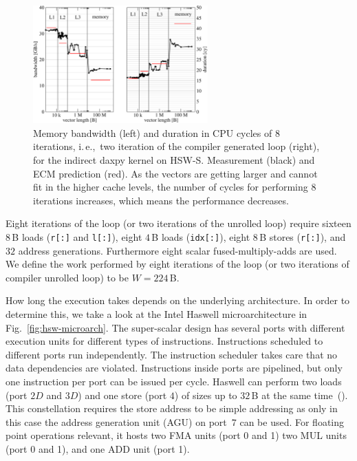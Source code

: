 \begin{figure}[t]
  \centering
  \includegraphics[width=0.60\textwidth,clip=true]{images/daxpy-indirect-bw-hasep1-f-2_3-w-cy}
   \caption{Memory bandwidth (left) and duration in CPU cycles of 8 iterations, i.\,e.,\ two iteration of the
compiler generated loop (right), for the indirect daxpy kernel on HSW-S.
   Measurement (black) and ECM prediction (red).
   As the vectors are getting larger and cannot fit in the higher cache levels, the number of cycles for performing 8 iterations increases, which means the performance decreases.}
  \label{fig:daxpy-indirect:perf}
\end{figure}

Eight iterations of the loop (or two iterations of the unrolled loop) require
sixteen $8$\,B loads (\verb|r[:]| and
\verb|l[:]|), eight $4$\,B loads (\verb'idx[:]'), eight
$8$\,B stores (\verb'r[:]'), and $32$ address generations.
Furthermore eight scalar fused-multiply-adds are used. 
We define the work performed by eight iterations of the loop (or two iterations of compiler unrolled loop) to be $W =
224$\,B.

How long the execution takes depends on the underlying architecture. 
In order to determine this, we take a look at the Intel Haswell
microarchitecture in Fig.~\ref{fig:hsw-microarch}.
The super-scalar design has several ports with different execution units for
different types of instructions.
Instructions scheduled to different ports run independently.
The instruction scheduler takes care that no data dependencies are violated.
Instructions inside ports are pipelined, but only one instruction per port can
be issued per cycle.
Haswell can perform two loads (port $2D$ and $3D$) and one store (port $4$) of
sizes up to $32$\,B at the same time~(\cite{agner-2016-11-3}).
This constellation requires the store address to be simple addressing as only in
this case the address generation unit (AGU) on port~$7$ can be used.
%
For floating point operations relevant, it hosts two FMA units (port 0 and
1) two MUL units (port 0 and 1), and one ADD unit (port 1).

